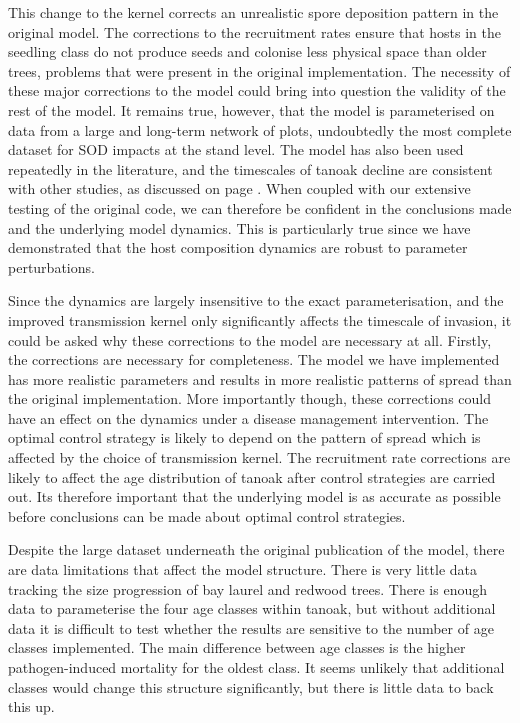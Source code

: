 This change to the kernel corrects an unrealistic spore deposition pattern in the original model. The corrections to the recruitment rates ensure that hosts in the seedling class do not produce seeds and colonise less physical space than older trees, problems that were present in the original implementation. The necessity of these major corrections to the model could bring into question the validity of the rest of the model. It remains true, however, that the model is parameterised on data from a large and long-term network of plots, undoubtedly the most complete dataset for SOD impacts at the stand level. The model has also been used repeatedly in the literature, and the timescales of tanoak decline are consistent with other studies, as discussed on page \pageref{sec:ch5:reparameterisation}. When coupled with our extensive testing of the original code, we can therefore be confident in the conclusions made and the underlying model dynamics. This is particularly true since we have demonstrated that the host composition dynamics are robust to parameter perturbations.

Since the dynamics are largely insensitive to the exact parameterisation, and the improved transmission kernel only significantly affects the timescale of invasion, it could be asked why these corrections to the model are necessary at all. Firstly, the corrections are necessary for completeness. The model we have implemented has more realistic parameters and results in more realistic patterns of spread than the original implementation. More importantly though, these corrections could have an effect on the dynamics under a disease management intervention. The optimal control strategy is likely to depend on the pattern of spread \citep{hyatt-twynam_risk-based_2017} which is affected by the choice of transmission kernel. The recruitment rate corrections are likely to affect the age distribution of tanoak after control strategies are carried out. Its therefore important that the underlying model is as accurate as possible before conclusions can be made about optimal control strategies.

Despite the large dataset underneath the original publication of the model, there are data limitations that affect the model structure. There is very little data tracking the size progression of bay laurel and redwood trees. There is enough data to parameterise the four age classes within tanoak, but without additional data it is difficult to test whether the results are sensitive to the number of age classes implemented. The main difference between age classes is the higher pathogen-induced mortality for the oldest class. It seems unlikely that additional classes would change this structure significantly, but there is little data to back this up.

